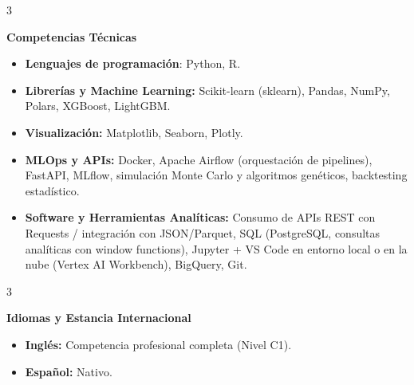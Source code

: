 \documentclass[10pt, letterpaper]{article}
\newenvironment{highlights}{
    \begin{itemize}[
        topsep=0.10 cm,
        parsep=0.10 cm,
        partopsep=0pt,
        itemsep=0pt,
        leftmargin=0.4 cm + 10pt
    ]
}{
    \end{itemize}
} %
\newenvironment{threecolentry}[3][]{
    \onecolentry
    \def\thirdColumn{#3}
    \setcolumnwidth{0 cm, \fill, 4.5 cm}
    \begin{paracol}{3}
    \noindent{\raggedright #2}\switchcolumn
}{
    \switchcolumn \raggedleft \thirdColumn
    \end{paracol}
    \endonecolentry
} %
\begin{document}
    \begin{threecolentry}{}{}
        \textbf{Competencias Técnicas}
        \begin{highlights}
            \item \textbf{Lenguajes de programación}: Python, R.
            \item \textbf{Librerías y Machine Learning:} Scikit-learn (sklearn), Pandas, NumPy, Polars, XGBoost, LightGBM.
            \item \textbf{Visualización:} Matplotlib, Seaborn, Plotly.
            \item \textbf{MLOps y APIs:} Docker, Apache Airflow (orquestación de pipelines), FastAPI, MLflow, simulación Monte Carlo y algoritmos genéticos, backtesting estadístico.
            \item \textbf{Software y Herramientas Analíticas:} Consumo de APIs REST con Requests / integración con JSON/Parquet, SQL (PostgreSQL, consultas analíticas con window functions), Jupyter + VS Code en entorno local o en la nube (Vertex AI Workbench), BigQuery, Git.
        \end{highlights}
    \end{threecolentry}

    \begin{threecolentry}{}{}
        \textbf{Idiomas y Estancia Internacional}
        \begin{highlights}
            \item \textbf{Inglés:} Competencia profesional completa (Nivel C1).
            \item \textbf{Español:} Nativo.
        \end{highlights}
    \end{threecolentry}
\end{document}
